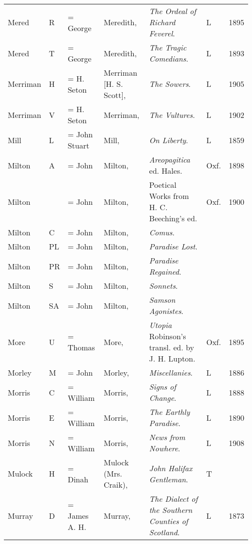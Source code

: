 \begin{sidewaystable}
\centering
\begin{tabular}{p{} p{} p{} p{} p{} p{} p{}}
Mered& R & = George & Meredith, & \textit{The Ordeal of Richard Feverel}. & L & 1895 \\
Mered& T & = George & Meredith, & \textit{The Tragic Comedians}. & L & 1893 \\
Merriman & H & = H. Seton & Merriman [H. S. Scott], & \textit{The Sowers}. & L & 1905 \\
Merriman& V & = H. Seton & Merriman, & \textit{The Vultures}. & L & 1902 \\
Mill & L & = John Stuart & Mill, & \textit{On Liberty}. & L & 1859 \\
Milton & A & = John & Milton, & \textit{Areopagitica} ed. Hales. & Oxf. & 1898 \\
Milton & & = John & Milton, & Poetical Works from H. C. Beeching's ed. & Oxf. & 1900 \\
Milton & C & = John & Milton, & \textit{Comus}. & & \\
Milton & PL & = John & Milton, & \textit{Paradise Lost}. & & \\
Milton & PR & = John & Milton, & \textit{Paradise Regained}. & & \\
Milton & S & = John & Milton, & \textit{Sonnets}. & & \\
Milton & SA & = John & Milton, & \textit{Samson Agonistes}. & & \\
More & U & = Thomas & More, & \textit{Utopia} Robinson's transl. ed. by J. H. Lupton. & Oxf. & 1895 \\
Morley & M & = John & Morley, & \textit{Miscellanies}. & L & 1886 \\
Morris & C & = William & Morris, & \textit{Signs of Change}. & L & 1888 \\
Morris & E & = William & Morris, & \textit{The Earthly Paradise}. & L & 1890 \\
Morris & N & = William & Morris, & \textit{News from Nowhere}. & L & 1908 \\
Mulock & H & = Dinah & Mulock (Mrs. Craik), & \textit{John Halifax Gentleman}. & T & \\
Murray & D & = James A. H. & Murray, & \textit{The Dialect of the Southern Counties of Scotland}. & L & 1873 \\
\end{tabular}
\end{sidewaystable}

